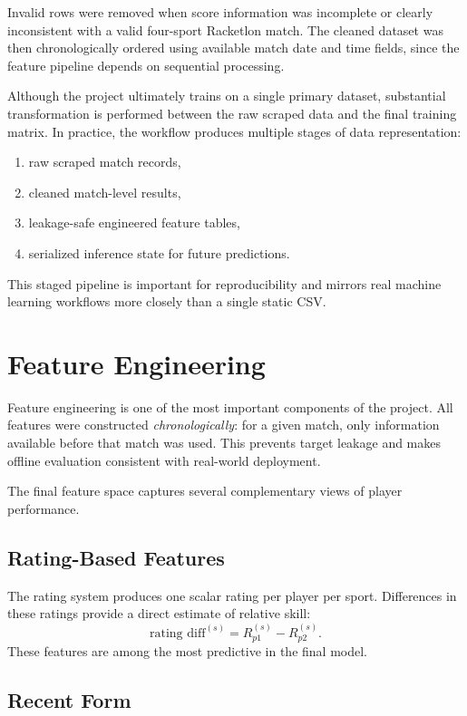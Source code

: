 \documentclass[10pt,twocolumn]{article}
\begin{document}
Invalid rows were removed when score information was incomplete or clearly inconsistent with a valid four-sport Racketlon match. The cleaned dataset was then chronologically ordered using available match date and time fields, since the feature pipeline depends on sequential processing.

Although the project ultimately trains on a single primary dataset, substantial transformation is performed between the raw scraped data and the final training matrix. In practice, the workflow produces multiple stages of data representation:
\begin{enumerate}[leftmargin=1.2em,itemsep=0.25em]
    \item raw scraped match records,
    \item cleaned match-level results,
    \item leakage-safe engineered feature tables,
    \item serialized inference state for future predictions.
\end{enumerate}

This staged pipeline is important for reproducibility and mirrors real machine learning workflows more closely than a single static CSV.

\section{Feature Engineering}

Feature engineering is one of the most important components of the project. All features were constructed \emph{chronologically}: for a given match, only information available before that match was used. This prevents target leakage and makes offline evaluation consistent with real-world deployment.

The final feature space captures several complementary views of player performance.

\subsection{Rating-Based Features}

The rating system produces one scalar rating per player per sport. Differences in these ratings provide a direct estimate of relative skill:
\[
    \text{rating diff}^{(s)} = R^{(s)}_{p1} - R^{(s)}_{p2}.
\]
These features are among the most predictive in the final model.

\subsection{Recent Form}
\end{document}
